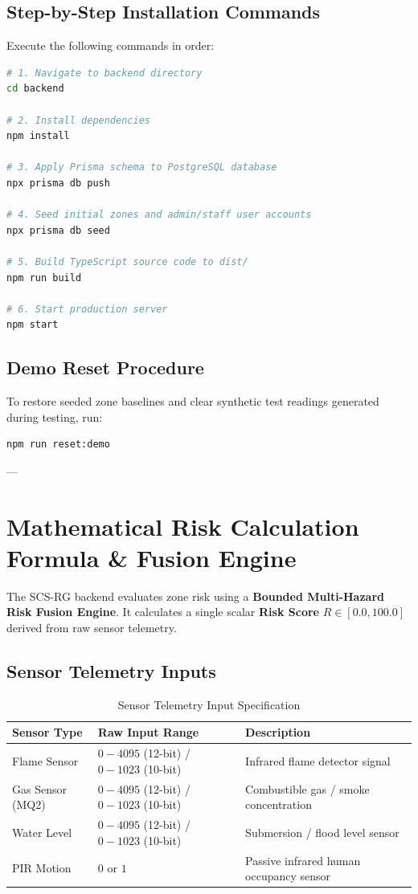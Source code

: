 \documentclass[11pt,a4paper]{article}
\begin{document}
\subsection{Step-by-Step Installation Commands}
Execute the following commands in order:

\begin{lstlisting}[language=bash]
# 1. Navigate to backend directory
cd backend

# 2. Install dependencies
npm install

# 3. Apply Prisma schema to PostgreSQL database
npx prisma db push

# 4. Seed initial zones and admin/staff user accounts
npx prisma db seed

# 5. Build TypeScript source code to dist/
npm run build

# 6. Start production server
npm start
\end{lstlisting}

\subsection{Demo Reset Procedure}
To restore seeded zone baselines and clear synthetic test readings generated during testing, run:
\begin{lstlisting}[language=bash]
npm run reset:demo
\end{lstlisting}

---

\section{Mathematical Risk Calculation Formula \& Fusion Engine}

The SCS-RG backend evaluates zone risk using a \textbf{Bounded Multi-Hazard Risk Fusion Engine}. It calculates a single scalar \textbf{Risk Score} $R \in [0.0, 100.0]$ derived from raw sensor telemetry.

\subsection{Sensor Telemetry Inputs}
\begin{table}[H]
\centering
\begin{tabularx}{\textwidth}{l l X}
\toprule
\textbf{Sensor Type} & \textbf{Raw Input Range} & \textbf{Description} \\
\midrule
Flame Sensor & $0 - 4095$ (12-bit) / $0 - 1023$ (10-bit) & Infrared flame detector signal \\
Gas Sensor (MQ2) & $0 - 4095$ (12-bit) / $0 - 1023$ (10-bit) & Combustible gas / smoke concentration \\
Water Level & $0 - 4095$ (12-bit) / $0 - 1023$ (10-bit) & Submersion / flood level sensor \\
PIR Motion & $0 \text{ or } 1$ & Passive infrared human occupancy sensor \\
\bottomrule
\end{tabularx}
\caption{Sensor Telemetry Input Specification}
\end{table}
\end{document}
